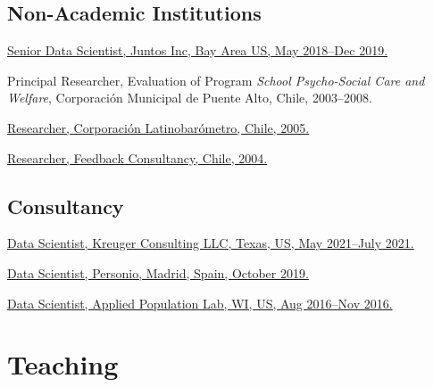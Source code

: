 \documentclass[10pt,letterpaper]{article}
\renewenvironment{itemize}{
  \begin{list}{}{
    \setlength{\leftmargin}{1.5em}
    \setlength{\itemsep}{0.25em}
    \setlength{\parskip}{0pt}
    \setlength{\parsep}{0.25em}
  }
}{
  \end{list}
}
\begin{document}


\subsection*{Non-Academic Institutions}

\begin{itemize}
\item \href{http://juntosglobal.com/}{Senior Data Scientist, Juntos Inc, Bay Area US, May 2018--Dec 2019.}
\item Principal Researcher, Evaluation of Program \textit{School Psycho-Social Care and Welfare}, Corporación Municipal de Puente Alto, Chile, 2003--2008.
\item \href{http://www.latinobarometro.org}{Researcher, Corporación Latinobarómetro, Chile, 2005.}
\item \href{http://www.feedback.cl}{Researcher, Feedback Consultancy, Chile, 2004.}
\end{itemize}


\subsection*{Consultancy}

\begin{itemize}
\item \href{https://www.kreugerconsulting.com/}{Data Scientist, Kreuger Consulting LLC, Texas, US, May 2021--July 2021.}
\item \href{https://www.personio.es/}{Data Scientist, Personio, Madrid, Spain, October 2019.}
\item \href{https://apl.wisc.edu}{Data Scientist, Applied Population Lab, WI, US, Aug 2016--Nov 2016.}
\end{itemize}


\section*{Teaching}
\end{document}
